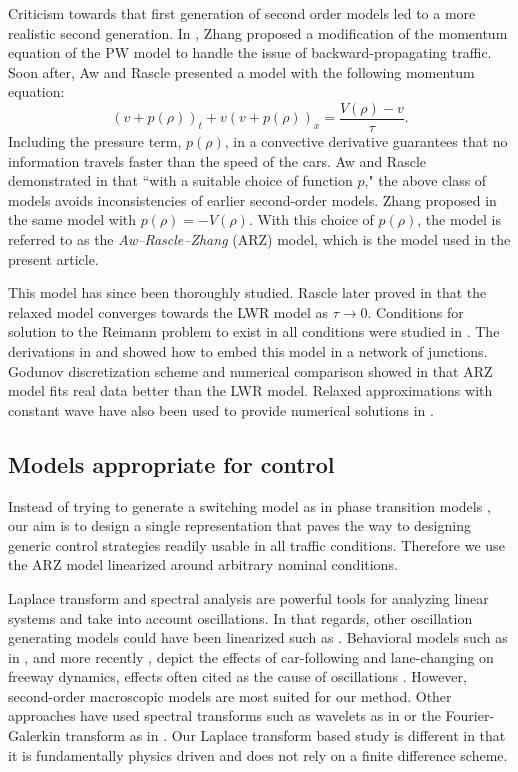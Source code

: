 \documentclass[5p,twocolumn]{elsarticle}
\begin{document}
Criticism towards that first generation of second order models led to a more realistic second generation. In \cite{Zhang1998}, Zhang proposed a modification of the momentum equation of the PW model to handle the issue of backward-propagating traffic. Soon after, Aw and Rascle \cite{AR} presented a model with the following momentum equation:
\begin{equation} \label{ARZEq}
(v+p(\rho))_t+v(v+p(\rho))_x=\frac{V(\rho)-v}{\tau}.
\end{equation}
Including the pressure term, $p(\rho)$, in a convective derivative guarantees that no information travels faster than the speed of the cars. Aw and Rascle demonstrated in \cite{AR} that ``with a suitable choice of function $p$," the above class of models avoids inconsistencies of earlier second-order models. Zhang proposed in \cite{Z} the same model with $p(\rho) = -V(\rho)$. With this choice of $p(\rho)$, the model is referred to as the \textit{Aw--Rascle--Zhang} (ARZ) model, which is the model used in the present article.

This model has since been thoroughly studied. Rascle later proved in \cite{R_improved} that the relaxed model converges towards the LWR model as $\tau \rightarrow 0$. Conditions for solution to the Reimann problem to exist in all conditions were studied in \cite{lebacque2007}. The derivations in \cite{HybridLagrangian2007} and \cite{garavello2006traffic} showed how to embed this model in a network of junctions. Godunov discretization scheme and numerical comparison showed in \cite{GodunovARZ} that ARZ model fits real data better than the LWR model. Relaxed approximations with constant wave have also been used to provide numerical solutions in \cite{Delis2014318}.

\subsection{Models appropriate for control}
Instead of trying to generate a switching model as in phase transition models \cite{colombo2003hyperbolic, treiber2010three, blandin2011general}, our aim is to design a single representation that paves the way to designing generic control strategies readily usable in all traffic conditions. Therefore we use the ARZ model linearized around arbitrary nominal conditions. 

Laplace transform and spectral analysis are powerful tools for analyzing linear systems and take into account oscillations. In that regards, other oscillation generating models could have been linearized such as \cite{Greenberg_congestionredux}. Behavioral models such as in \cite{Newell, treiber2000congested}, and more recently \cite{Chen2012, Ge20129}, depict the effects of car-following and lane-changing on freeway dynamics, effects often cited as the cause of oscillations \cite{Mauch02freewaytraffic, lanechangin2005,lanechanging2007}. However, second-order macroscopic models are most suited for our method. Other approaches have used spectral transforms such as wavelets as in \cite{Zheng2011} or the Fourier-Galerkin transform as in \cite{fourierGalerkin}. Our Laplace transform based study is different in that it is fundamentally physics driven and does not rely on a finite difference scheme.
\end{document}
